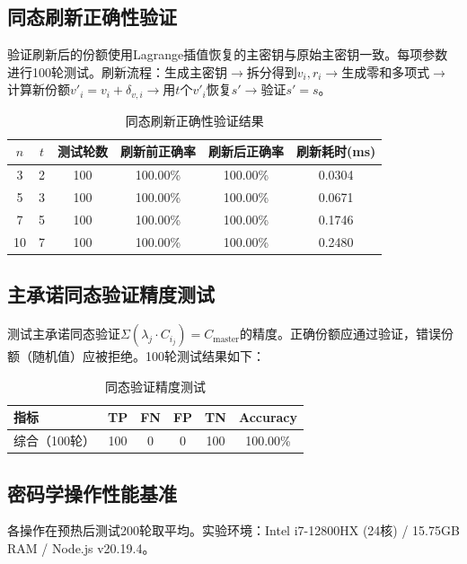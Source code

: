 \documentclass[UTF8,a4paper,zihao=-4,openany]{ctexrep}
\begin{document}
\subsection{同态刷新正确性验证}

验证刷新后的份额使用Lagrange插值恢复的主密钥与原始主密钥一致。每项参数进行100轮测试。刷新流程：生成主密钥$\to$拆分得到$v_i,r_i$$\to$生成零和多项式$\to$计算新份额$v'_i = v_i + \delta_{v,i}$$\to$用$t$个$v'_i$恢复$s'$$\to$验证$s' = s$。

\begin{table}[htbp]
\centering
\caption{同态刷新正确性验证结果}
\label{tab:refresh_test}
\begin{tabularx}{\textwidth}{cccccc}
\toprule
$n$ & $t$ & 测试轮数 & 刷新前正确率 & 刷新后正确率 & 刷新耗时(ms)\\
\midrule
3 & 2 & 100 & 100.00\% & 100.00\% & 0.0304\\
5 & 3 & 100 & 100.00\% & 100.00\% & 0.0671\\
7 & 5 & 100 & 100.00\% & 100.00\% & 0.1746\\
10 & 7 & 100 & 100.00\% & 100.00\% & 0.2480\\
\bottomrule
\end{tabularx}
\end{table}

\subsection{主承诺同态验证精度测试}

测试主承诺同态验证$\Sigma(\lambda_j \cdot C_{i_j}) = C_{\text{master}}$的精度。正确份额应通过验证，错误份额（随机值）应被拒绝。100轮测试结果如下：

\begin{table}[htbp]
\centering
\caption{同态验证精度测试}
\label{tab:verify}
\begin{tabularx}{\textwidth}{lccccc}
\toprule
指标 & TP & FN & FP & TN & Accuracy\\
\midrule
综合（100轮） & 100 & 0 & 0 & 100 & 100.00\%\\
\bottomrule
\end{tabularx}
\end{table}

\subsection{密码学操作性能基准}

各操作在预热后测试200轮取平均。实验环境：Intel i7-12800HX (24核) / 15.75GB RAM / Node.js v20.19.4。
\end{document}
